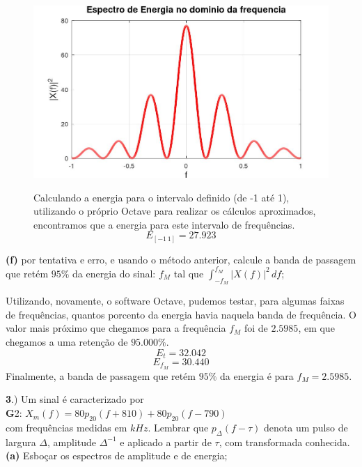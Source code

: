 \documentclass[10pt, a4paper]{article}
\begin{document}
\begin{figure}[h]
    \begin{minipage}[!]{0.50\linewidth}
        \includegraphics[scale=0.27]{plot2e.jpg}        
    \end{minipage}
    \begin{minipage}[!]{0.48\linewidth}
        Calculando a energia para o intervalo definido (de -1 até 1), utilizando o próprio Octave para realizar os cálculos aproximados, encontramos que a energia para este intervalo de frequências.
        \[E_{[-1\,1]} = 27.923\]        
    \end{minipage}
\end{figure}

{\textbf{(f)}} por tentativa e erro, e usando o método anterior, calcule a banda de passagem que retém $95\%$ da energia do sinal: $f_{M}$ tal que $\int_{-f_{M}}^{f_{M}} |X(f)|^{2}\,df$;

Utilizando, novamente, o software Octave, pudemos testar, para algumas faixas de frequências, quantos porcento da energia havia naquela banda de frequência. O valor mais próximo que chegamos para a frequência $f_{M}$ foi de $2.5985$, em que chegamos a uma retenção de $95.000\%$.
\[E_{t} = 32.042\]
\[E_{f_{M}} = 30.440\]
Finalmente, a banda de passagem que retém $95\%$ da energia é para $f_{M} = 2.5985$.

\vspace{\baselineskip}

{\textbf 3.)} Um sinal é caracterizado por\\
{\textbf G2:} $ X_{m}(f) = 80p_{20}(f + 810) + 80p_{20}(f - 790) $\\
com frequências medidas em $kHz$. Lembrar que $p_{\Delta}(f - \tau)$ denota um pulso de largura $\Delta$, amplitude $\Delta^{-1}$ e aplicado a partir de $\tau$, com transformada conhecida.\\
{\textbf{(a)}} Esboçar os espectros de amplitude e de energia;
\end{document}
